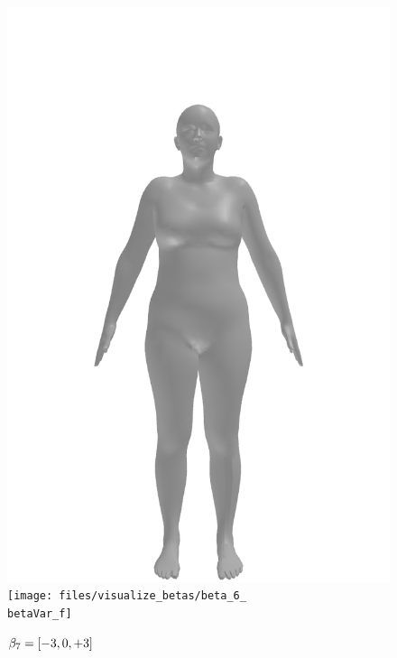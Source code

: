 \begin{figure}[ht!]
\begin{minipage}[b]{\textwidth}
        \includegraphics[width=\imgWidth]{files/visualize_betas/baseline_f}
        \texttt{[image: files/visualize\_betas/beta\_6\_\\betaVar\_f]}
        \caption{$\beta_7 = [-3, 0, +3]$}
    \end{minipage}
\end{figure}

